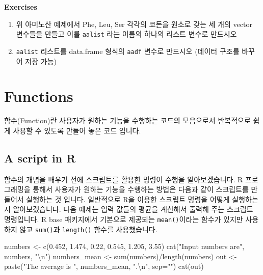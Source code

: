 \documentclass[
]{book}
\newenvironment{Shaded}{\begin{snugshade}}{\end{snugshade}}
\newcommand{\AttributeTok}[1]{\textcolor[rgb]{0.77,0.63,0.00}{#1}}
\newcommand{\FloatTok}[1]{\textcolor[rgb]{0.00,0.00,0.81}{#1}}
\newcommand{\FunctionTok}[1]{\textcolor[rgb]{0.00,0.00,0.00}{#1}}
\newcommand{\NormalTok}[1]{#1}
\newcommand{\OtherTok}[1]{\textcolor[rgb]{0.56,0.35,0.01}{#1}}
\newcommand{\SpecialCharTok}[1]{\textcolor[rgb]{0.00,0.00,0.00}{#1}}
\newcommand{\StringTok}[1]{\textcolor[rgb]{0.31,0.60,0.02}{#1}}
\begin{document}
\textbf{Exercises}

\begin{enumerate}
\def\labelenumi{\arabic{enumi}.}
\item
  위 아미노산 예제에서 Phe, Leu, Ser 각각의 코돈을 원소로 갖는 세 개의 vector 변수들을 만들고 이를 \texttt{aalist} 라는 이름의 하나의 리스트 변수로 만드시오
\item
  \texttt{aalist} 리스트를 data.frame 형식의 \texttt{aadf} 변수로 만드시오 (데이터 구조를 바꾸어 저장 가능)
\end{enumerate}

\hypertarget{functions}{%
\section{Functions}\label{functions}}

함수(Function)란 사용자가 원하는 기능을 수행하는 코드의 모음으로서 반복적으로 쉽게 사용할 수 있도록 만들어 놓은 코드 입니다.

\hypertarget{a-script-in-r}{%
\subsection{A script in R}\label{a-script-in-r}}

함수의 개념을 배우기 전에 스크립트를 활용한 명령어 수행을 알아보겠습니다. R 프로그래밍을 통해서 사용자가 원하는 기능을 수행하는 방법은 다음과 같이 스크립트를 만들어서 실행하는 것 입니다. 일반적으로 R을 이용한 스크립트 명령을 어떻게 실행하는지 알아보겠습니다. 다음 예제는 입력 값들의 평균을 계산해서 출력해 주는 스크립트 명령입니다. R base 패키지에서 기본으로 제공되는 \texttt{mean()}이라는 함수가 있지만 사용하지 않고 \texttt{sum()}과 \texttt{length()} 함수를 사용했습니다.

\begin{Shaded}
\begin{Highlighting}[]

\NormalTok{numbers }\OtherTok{\textless{}{-}} \FunctionTok{c}\NormalTok{(}\FloatTok{0.452}\NormalTok{, }\FloatTok{1.474}\NormalTok{, }\FloatTok{0.22}\NormalTok{, }\FloatTok{0.545}\NormalTok{, }\FloatTok{1.205}\NormalTok{, }\FloatTok{3.55}\NormalTok{)}
\FunctionTok{cat}\NormalTok{(}\StringTok{"Input numbers are"}\NormalTok{, numbers, }\StringTok{"}\SpecialCharTok{\textbackslash{}n}\StringTok{"}\NormalTok{)}
\NormalTok{numbers\_mean }\OtherTok{\textless{}{-}} \FunctionTok{sum}\NormalTok{(numbers)}\SpecialCharTok{/}\FunctionTok{length}\NormalTok{(numbers)}
\NormalTok{out }\OtherTok{\textless{}{-}} \FunctionTok{paste}\NormalTok{(}\StringTok{"The average is "}\NormalTok{, numbers\_mean, }\StringTok{".}\SpecialCharTok{\textbackslash{}n}\StringTok{"}\NormalTok{, }\AttributeTok{sep=}\StringTok{""}\NormalTok{)}
\FunctionTok{cat}\NormalTok{(out)}
\end{Highlighting}
\end{Shaded}
\end{document}
